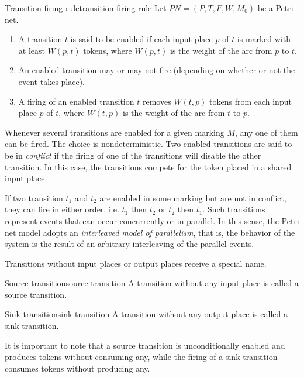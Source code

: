 \begin{definition}{Transition firing rule}{transition-firing-rule}
    Let $ PN = (P, T, F, W, M_{0}) $ be a Petri net.
    \begin{enumerate}[label=(\roman*)]
        \item A transition $t$ is said to be enabled if each input place $p$ of $t$
              is marked with at least $W(p, t)$ tokens, where $W(p,t)$ is the weight of the arc from $p$ to $t$.
        \item An enabled transition may or may not fire (depending on whether or not the event takes place).
        \item A firing of an enabled transition $t$ removes $W(t,p)$ tokens from each input place $p$ of $t$,
              where $W(t, p)$ is the weight of the arc from $t$ to $p$.
    \end{enumerate}
\end{definition}

Whenever several transitions are enabled for a given marking $M$,
any one of them can be fired.
The choice is nondeterministic.
Two enabled transitions are said to be in \emph{conflict}
if the firing of one of the transitions will disable the other transition.
In this case, the transitions compete for the token placed in a shared input place.

If two transition $t_1$ and $t_2$ are enabled in some marking but are not in conflict,
they can fire in either order, i.e. $t_1$ then $t_2$ or $t_2$ then $t_1$.
Such transitions represent events that can occur concurrently or in parallel.
In this sense, the Petri net model adopts an \emph{interleaved model of parallelism}, that is,
the behavior of the system is the result of an arbitrary interleaving of the parallel events.

Transitions without input places or output places receive a special name.

\begin{definition}{Source transition}{source-transition}
    A transition without any input place is called a source transition.
\end{definition}

\begin{definition}{Sink transition}{sink-transition}
    A transition without any output place is called a sink transition.
\end{definition}

It is important to note that a source transition is unconditionally enabled
and produces tokens without consuming any, while the firing of a sink transition
consumes tokens without producing any.

